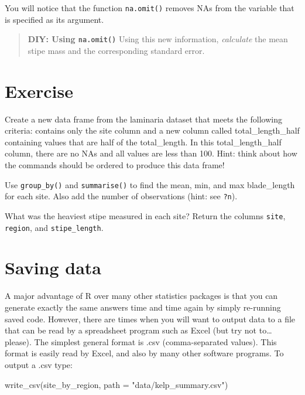 \documentclass[
]{book}
\newenvironment{Shaded}{\begin{snugshade}}{\end{snugshade}}
\newcommand{\AttributeTok}[1]{\textcolor[rgb]{0.77,0.63,0.00}{#1}}
\newcommand{\FunctionTok}[1]{\textcolor[rgb]{0.00,0.00,0.00}{#1}}
\newcommand{\NormalTok}[1]{#1}
\newcommand{\StringTok}[1]{\textcolor[rgb]{0.31,0.60,0.02}{#1}}
\begin{document}
You will notice that the function \texttt{na.omit()} removes NAs from the variable that is specified as its argument.

\begin{quote}
\textbf{DIY: Using \texttt{na.omit()}}
Using this new information, \emph{calculate} the mean stipe mass and the corresponding standard error.
\end{quote}

\hypertarget{exercise-2}{%
\section{Exercise}\label{exercise-2}}

Create a new data frame from the laminaria dataset that meets the following criteria: contains only the site column and a new column called total\_length\_half containing values that are half of the total\_length. In this total\_length\_half column, there are no NAs and all values are less than 100. Hint: think about how the commands should be ordered to produce this data frame!

Use \texttt{group\_by()} and \texttt{summarise()} to find the mean, min, and max blade\_length for each site. Also add the number of observations (hint: see \texttt{?n}).

What was the heaviest stipe measured in each site? Return the columns \texttt{site}, \texttt{region}, and \texttt{stipe\_length}.

\hypertarget{saving-data}{%
\section{Saving data}\label{saving-data}}

A major advantage of R over many other statistics packages is that you can generate exactly the same answers time and time again by simply re-running saved code. However, there are times when you will want to output data to a file that can be read by a spreadsheet program such as Excel (but try not to\ldots{} please). The simplest general format is .csv (comma-separated values). This format is easily read by Excel, and also by many other software programs. To output a .csv type:

\begin{Shaded}
\begin{Highlighting}[]
\FunctionTok{write\_csv}\NormalTok{(site\_by\_region, }\AttributeTok{path =} \StringTok{"data/kelp\_summary.csv"}\NormalTok{)}
\end{Highlighting}
\end{Shaded}
\end{document}
